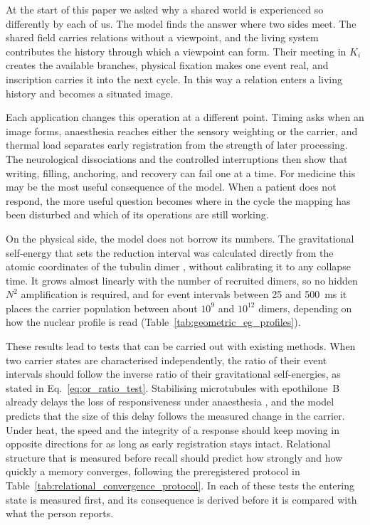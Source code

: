 At the start of this paper we asked why a shared world is experienced so differently
by each of us. The model finds the answer where two sides meet. The shared field carries relations
without a viewpoint, and the living system contributes the history through which a
viewpoint can form. Their meeting in $K_i$ creates the available branches, physical
fixation makes one event real, and inscription carries it into the next cycle. In
this way a relation enters a living history and becomes a situated image.

Each application changes this operation at a different point. Timing asks when an
image forms, anaesthesia reaches either the sensory weighting or the carrier, and
thermal load separates early registration from the strength of later processing.
The neurological dissociations and the controlled interruptions then show that
writing, filling, anchoring, and recovery can fail one at a time. For medicine this
may be the most useful consequence of the model. When a patient does not respond, the
more useful question becomes where in the cycle the mapping has been disturbed and
which of its operations are still working.

On the physical side, the model does not borrow its numbers. The gravitational
self-energy that sets the reduction interval was calculated directly from the atomic
coordinates of the tubulin dimer \citep{lowe2001}, without calibrating it to any
collapse time. It grows almost linearly with the number of recruited dimers, so no
hidden $N^2$ amplification is required, and for event intervals between 25 and
500~ms it places the carrier population between about $10^9$ and $10^{12}$ dimers,
depending on how the nuclear profile is read (Table~\ref{tab:geometric_eg_profiles}).

These results lead to tests that can be carried out with existing methods. When two
carrier states are characterised independently, the ratio of their event intervals
should follow the inverse ratio of their gravitational self-energies, as stated in
Eq.~\eqref{eq:or_ratio_test}. Stabilising microtubules with epothilone~B already
delays the loss of responsiveness under anaesthesia \citep{khan2024,huang2026}, and
the model predicts that the size of this delay follows the measured change in the
carrier. Under heat, the speed and the integrity of a response should keep moving in
opposite directions for as long as early registration stays intact. Relational
structure that is measured before recall should predict how strongly and how quickly
a memory converges, following the preregistered protocol in
Table~\ref{tab:relational_convergence_protocol}. In each of these tests the entering
state is measured first, and its consequence is derived before it is compared with
what the person reports.

